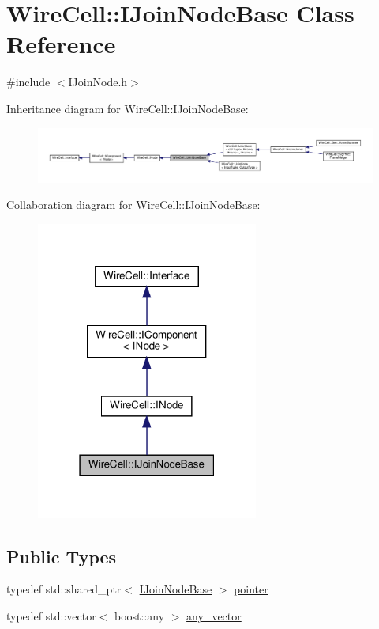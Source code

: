 \hypertarget{class_wire_cell_1_1_i_join_node_base}{}\section{Wire\+Cell\+:\+:I\+Join\+Node\+Base Class Reference}
\label{class_wire_cell_1_1_i_join_node_base}


{\ttfamily \#include $<$I\+Join\+Node.\+h$>$}



Inheritance diagram for Wire\+Cell\+:\+:I\+Join\+Node\+Base\+:
\nopagebreak
\begin{figure}[H]
\begin{center}
\leavevmode
\includegraphics[width=350pt]{class_wire_cell_1_1_i_join_node_base__inherit__graph}
\end{center}
\end{figure}


Collaboration diagram for Wire\+Cell\+:\+:I\+Join\+Node\+Base\+:
\nopagebreak
\begin{figure}[H]
\begin{center}
\leavevmode
\includegraphics[width=207pt]{class_wire_cell_1_1_i_join_node_base__coll__graph}
\end{center}
\end{figure}
\subsection*{Public Types}
\begin{DoxyCompactItemize}
\item 
typedef std\+::shared\+\_\+ptr$<$ \hyperlink{class_wire_cell_1_1_i_join_node_base}{I\+Join\+Node\+Base} $>$ \hyperlink{class_wire_cell_1_1_i_join_node_base_a9491ccf1feadd927311d30eba0ff816b}{pointer}
\item 
typedef std\+::vector$<$ boost\+::any $>$ \hyperlink{class_wire_cell_1_1_i_join_node_base_a5d53e0f00c30b472677c399c7d358fa3}{any\+\_\+vector}
\end{DoxyCompactItemize}
